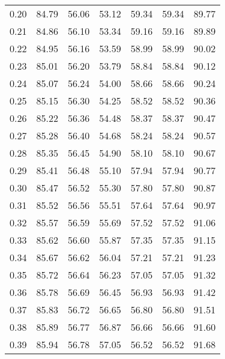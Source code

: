 \begin{tabular}{|c|c|c|c|c|c|c|}
      0.20 &     84.79 &     56.06 &      53.12 &   59.34 &      59.34 &         89.77 \\
      0.21 &     84.86 &     56.10 &      53.34 &   59.16 &      59.16 &         89.89 \\
      0.22 &     84.95 &     56.16 &      53.59 &   58.99 &      58.99 &         90.02 \\
      0.23 &     85.01 &     56.20 &      53.79 &   58.84 &      58.84 &         90.12 \\
      0.24 &     85.07 &     56.24 &      54.00 &   58.66 &      58.66 &         90.24 \\
      0.25 &     85.15 &     56.30 &      54.25 &   58.52 &      58.52 &         90.36 \\
      0.26 &     85.22 &     56.36 &      54.48 &   58.37 &      58.37 &         90.47 \\
      0.27 &     85.28 &     56.40 &      54.68 &   58.24 &      58.24 &         90.57 \\
      0.28 &     85.35 &     56.45 &      54.90 &   58.10 &      58.10 &         90.67 \\
      0.29 &     85.41 &     56.48 &      55.10 &   57.94 &      57.94 &         90.77 \\
      0.30 &     85.47 &     56.52 &      55.30 &   57.80 &      57.80 &         90.87 \\
      0.31 &     85.52 &     56.56 &      55.51 &   57.64 &      57.64 &         90.97 \\
      0.32 &     85.57 &     56.59 &      55.69 &   57.52 &      57.52 &         91.06 \\
      0.33 &     85.62 &     56.60 &      55.87 &   57.35 &      57.35 &         91.15 \\
      0.34 &     85.67 &     56.62 &      56.04 &   57.21 &      57.21 &         91.23 \\
      0.35 &     85.72 &     56.64 &      56.23 &   57.05 &      57.05 &         91.32 \\
      0.36 &     85.78 &     56.69 &      56.45 &   56.93 &      56.93 &         91.42 \\
      0.37 &     85.83 &     56.72 &      56.65 &   56.80 &      56.80 &         91.51 \\
      0.38 &     85.89 &     56.77 &      56.87 &   56.66 &      56.66 &         91.60 \\
      0.39 &     85.94 &     56.78 &      57.05 &   56.52 &      56.52 &         91.68 \\

\end{tabular}
